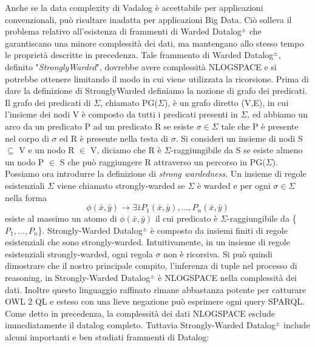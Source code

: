 Anche se la data complexity di Vadalog è accettabile per applicazioni convenzionali, può risultare inadatta per applicazioni Big Data. \newline
Ciò solleva il problema relativo all'esistenza di frammenti di Warded Datalog$^\pm$ che garantiscano una minore complessità dei dati, ma mantengano allo stesso tempo le proprietà descritte in precedenza. \newline
Tale frammento di Warded Datalog$^\pm$, definito "\emph{StronglyWarded}", dovrebbe avere complessità NLOGSPACE e si potrebbe ottenere limitando il modo in cui viene utilizzata la ricorsione. Prima di dare la definizione di StronglyWarded definiamo la nozione di grafo dei predicati. \newline
Il grafo dei predicati di $\Sigma$, chiamato PG($\Sigma$), è un grafo diretto (V,E), in cui l'insieme dei nodi V è composto da tutti i predicati presenti in $\Sigma$, ed abbiamo un arco da un predicato P ad un predicato R se esiste $\sigma \in \Sigma$ tale che P è presente nel corpo di $\sigma$ ed R è presente nella testa di $\sigma$. Si consideri un insieme di nodi S $\subseteq$ V e un nodo R $\in$ V, diciamo che R è $\Sigma$-raggiungibile da S se esiste almeno un nodo P $\in$ S che può raggiungere R attraverso un percorso in PG($\Sigma$). \newline
Possiamo ora introdurre la definizione di \emph{strong wardedness}. Un insieme di regole esistenziali $\Sigma$ viene chiamato strongly-warded se $\Sigma$ è warded e per ogni $\sigma \in \Sigma$ nella forma \[\phi(\bar{x}, \bar{y}) \rightarrow \exists \bar{z} P_{1}(\bar{x}, \bar{y}), ..., P_{n}(\bar{x}, \bar{y})\] esiste al massimo un atomo di $\phi(\bar{x}, \bar{y})$ il cui predicato è $\Sigma$-raggiungibile da \{$P_{1}, ..., P_{n}$\}. \newline
Strongly-Warded Datalog$^\pm$ è composto da insiemi finiti di regole esistenziali che sono strongly-warded. \newline
Intuitivamente, in un insieme di regole esistenziali strongly-warded, ogni regola $\sigma$ non è ricorsiva. Si può quindi dimostrare che il nostro principale compito, l'inferenza di tuple nel processo di reasoning, in Strongly-Warded Datalog$^\pm$ è NLOGSPACE nella complessità dei dati. Inoltre questo linguaggio raffinato rimane abbastanza potente per catturare OWL 2 QL e esteso con una lieve negazione può esprimere ogni query SPARQL. \newline
Come detto in precedenza, la complessità dei dati NLOGSPACE esclude immediatamente il datalog completo. Tuttavia Strongly-Warded Datalog$^\pm$ include alcuni importanti e ben studiati frammenti di Datalog:
